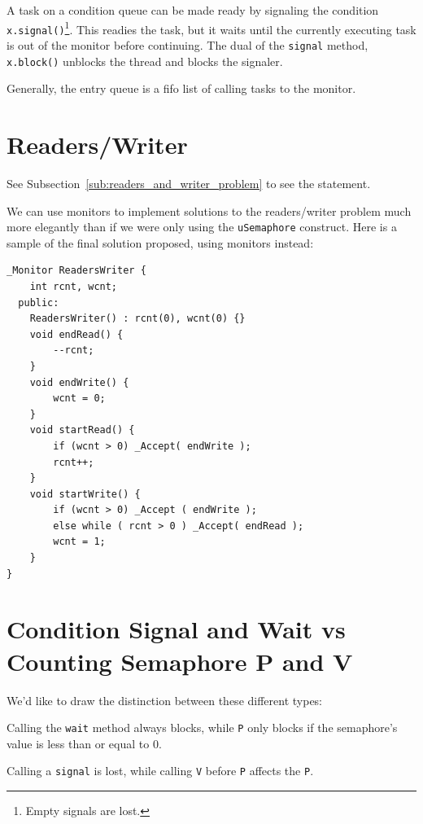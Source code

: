                 A task on a condition queue can be made ready by signaling the condition \verb|x.signal()|\footnote{Empty signals are lost.}.
                This readies the task, but it waits until the currently executing task is out of the monitor before continuing.
                The dual of the \verb|signal| method, \verb|x.block()| unblocks the thread and blocks the signaler.

                Generally, the entry queue is a fifo list of calling tasks to the monitor.

        \section{Readers/Writer} %
        \label{sec:readers_writer}
            See Subsection~\ref{sub:readers_and_writer_problem} to see the statement.

            We can use monitors to implement solutions to the readers/writer problem much more elegantly than if we were only using the \verb|uSemaphore| construct.
            Here is a sample of the final solution proposed, using monitors instead:
            \begin{lstlisting}
_Monitor ReadersWriter {
    int rcnt, wcnt;
  public:
    ReadersWriter() : rcnt(0), wcnt(0) {}
    void endRead() {
        --rcnt;
    }
    void endWrite() {
        wcnt = 0;
    }
    void startRead() {
        if (wcnt > 0) _Accept( endWrite );
        rcnt++;
    }
    void startWrite() {
        if (wcnt > 0) _Accept ( endWrite );
        else while ( rcnt > 0 ) _Accept( endRead );
        wcnt = 1;
    }
}
            \end{lstlisting}
        \section{Condition Signal and Wait vs Counting Semaphore P and V} %
        \label{sec:condition_signal_and_wait_vs_counting_semaphore}
            We'd like to draw the distinction between these different types:

            Calling the \verb|wait| method always blocks, while \verb|P| only blocks if the semaphore's value is less than or equal to 0.

            Calling a \verb|signal| is lost, while calling \verb|V| before \verb|P| affects the \verb|P|.

